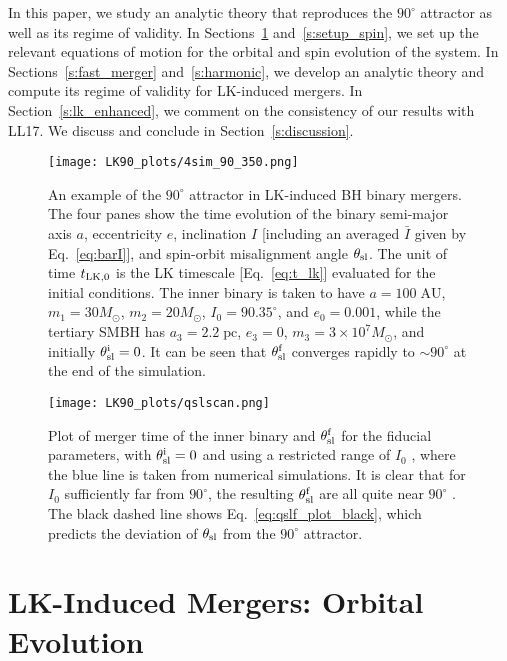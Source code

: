 \documentclass[
        twocolumn,
        twocolappendix
    ]{aastex63}
\begin{document}
In this paper, we study an analytic theory that reproduces the $90^\circ$
attractor as well as its regime of validity. In Sections~\ref{s:setup_orbital}
and~\ref{s:setup_spin}, we set up the relevant equations of motion for the
orbital and spin evolution of the system. In Sections~\ref{s:fast_merger}
and~\ref{s:harmonic}, we develop an analytic theory and compute its regime of
validity for LK-induced mergers. In Section~\ref{s:lk_enhanced}, we comment on
the consistency of our results with LL17. We discuss and conclude in
Section~\ref{s:discussion}.

\begin{figure}
    \centering
    \texttt{[image: LK90\_plots/4sim\_90\_350.png]}
    \caption{An example of the $90^\circ$ attractor in LK-induced BH binary
    mergers. The four panes show the time evolution of the binary semi-major
    axis $a$, eccentricity $e$, inclination $I$ [including an averaged $\bar{I}$
    given by Eq.~\eqref{eq:barI}], and spin-orbit misalignment angle
    $\theta_{\rm sl}$. The unit of time $t_{\rm LK, 0}$ is the LK timescale
    [Eq.~\eqref{eq:t_lk}] evaluated for the initial conditions. The inner binary
    is taken to have $a = 100\;\mathrm{AU}$, $m_1 = 30M_{\odot}$, $m_2 =
    20M_{\odot}$, $I_0 = 90.35^\circ$, and $e_0 = 0.001$, while the tertiary
    SMBH has $a_3 = 2.2\;\mathrm{pc}$, $e_3 = 0$, $m_3 = 3 \times 10^7
    M_{\odot}$, and initially $\theta_{\rm sl}^{\rm i} = 0$. It can be seen that
    $\theta_{\rm sl}^{\rm f}$ converges rapidly to $\sim 90^\circ$ at the end of
    the simulation.}\label{fig:4sim_90_350}
\end{figure}
\begin{figure}
    \centering
    \texttt{[image: LK90\_plots/qslscan.png]}
    \caption{Plot of merger time of the inner binary and $\theta_{\rm sl}^{\rm
    f}$ for the fiducial parameters, with $\theta_{\rm sl}^{\rm i} = 0$ and
    using a restricted range of $I_0$ \citep[analogous to the bottom-most panel
    in Fig.~3 of][]{bin2}, where the blue line is taken from numerical
    simulations. It is clear that for $I_0$ sufficiently far from $90^\circ$,
    the resulting $\theta_{\rm sl}^{\rm f}$ are all quite near $90^\circ$
    \citep{bin2}. The black dashed line shows Eq.~\eqref{eq:qslf_plot_black},
    which predicts the deviation of $\theta_{\rm sl}$ from the $90^\circ$
    attractor.}\label{fig:qslscan}
\end{figure}

\section{LK-Induced Mergers: Orbital Evolution}\label{s:setup_orbital}
\end{document}
